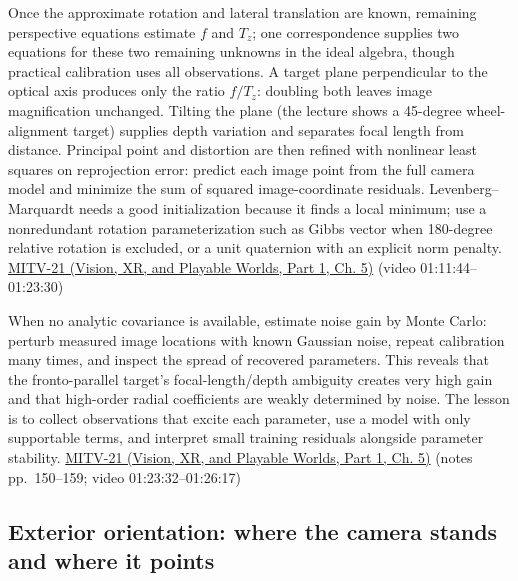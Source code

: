 Once the approximate rotation and lateral translation are known, remaining perspective equations estimate \(f\) and \(T_z\); one correspondence supplies two equations for these two remaining unknowns in the ideal algebra, though practical calibration uses all observations. A target plane perpendicular to the optical axis produces only the ratio \(f/T_z\): doubling both leaves image magnification unchanged. Tilting the plane (the lecture shows a 45-degree wheel-alignment target) supplies depth variation and separates focal length from distance. Principal point and distortion are then refined with nonlinear least squares on reprojection error: predict each image point from the full camera model and minimize the sum of squared image-coordinate residuals. Levenberg--Marquardt needs a good initialization because it finds a local minimum; use a nonredundant rotation parameterization such as Gibbs vector when 180-degree relative rotation is excluded, or a unit quaternion with an explicit norm penalty. \href{../07-Vision-XR-and-Playable-Worlds-P01/main.pdf\#nameddest=04-visual-computing-ii-ch036-mitv-21---relative-orientation-binocular-stereo-structure-quadrics-calibration-reprojection}{MITV-21 (Vision, XR, and Playable Worlds, Part 1, Ch. 5)} (video 01:11:44--01:23:30)

When no analytic covariance is available, estimate noise gain by Monte Carlo: perturb measured image locations with known Gaussian noise, repeat calibration many times, and inspect the spread of recovered parameters. This reveals that the fronto-parallel target's focal-length/depth ambiguity creates very high gain and that high-order radial coefficients are weakly determined by noise. The lesson is to collect observations that excite each parameter, use a model with only supportable terms, and interpret small training residuals alongside parameter stability. \href{../07-Vision-XR-and-Playable-Worlds-P01/main.pdf\#nameddest=04-visual-computing-ii-ch036-mitv-21---relative-orientation-binocular-stereo-structure-quadrics-calibration-reprojection}{MITV-21 (Vision, XR, and Playable Worlds, Part 1, Ch. 5)} (notes pp.~150--159; video 01:23:32--01:26:17)

\subsection{Exterior orientation: where the camera stands and where it points}\label{03-visual-computing-i-ch003-exterior-orientation-where-the-camera-stands-and-where-it-points}

